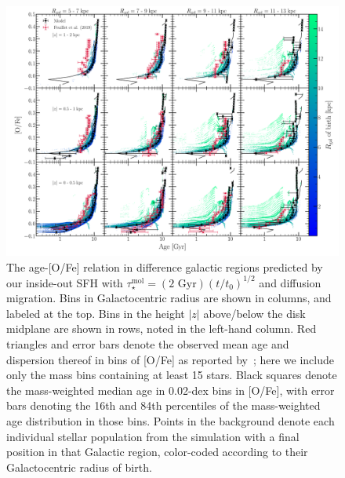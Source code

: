 \documentclass[a4paper, fleqn, usenatbib, useAMS]{mnras}
\begin{document}
\begin{figure} 
\centering 
\includegraphics[scale = 0.32]{age_alpha_regions.pdf} 
\caption{The age-[O/Fe] relation in difference galactic regions predicted by 
our inside-out SFH with $\tau_\star^\text{mol} = (\text{2 Gyr})(t/t_0)^{1/2}$ 
and diffusion migration. Bins in Galactocentric radius are shown in columns, 
and labeled at the top. Bins in the height $\left|z\right|$ above/below the 
disk midplane are shown in rows, noted in the left-hand column. Red triangles 
and error bars denote the observed mean age and dispersion thereof in bins of 
[O/Fe] as reported by~\citet{Feuillet2019}; here we include only the mass bins 
containing at least 15 stars. Black squares denote the mass-weighted median 
age in 0.02-dex bins in [O/Fe], with error bars denoting the 16th and 84th 
percentiles of the mass-weighted age distribution in those bins. Points in the 
background denote each individual stellar population from the simulation with 
a final position in that Galactic region, color-coded according to their 
Galactocentric radius of birth. } 
\label{fig:age_alpha_regions} 
\end{figure} 
\end{document}
